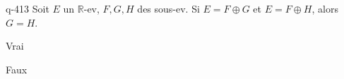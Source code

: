 \begin{truefalse}{q-413}
Soit $E$ un $\mathbb R$-ev, $F,G,H$ des sous-ev. Si $E=F \oplus G$ et $E=F \oplus H$, alors $G=H$.
\item Vrai
\item* Faux
\end{truefalse}

